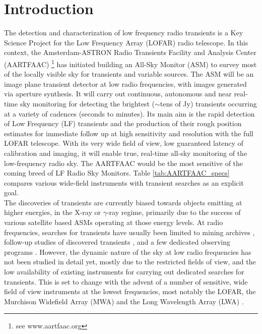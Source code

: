 \documentclass{aa}
\begin{document}

\maketitle

\section{\label{sec:Introduction}Introduction}
The detection  and characterization of low  frequency radio transients  is a Key
Science  Project \citep{fender2006lofar}  for  the Low  Frequency Array  (LOFAR)
\citep{unhealed2013lofar}    radio   telescope.     In    this   context,    the
Amsterdam-ASTRON    Radio    Transients    Facility    and    Analysis    Center
(AARTFAAC) \footnote{see  www.aartfaac.org }  has initiated building  an All-Sky
Monitor  (ASM) to  survey most  of the  locally visible  sky for  transients and
variable sources.   The ASM  will be  an image plane  transient detector  at low
radio frequencies, with images generated  via aperture synthesis.  It will carry
out continuous, autonomous  and near real-time sky monitoring  for detecting the
brightest  ($\sim$tens of  Jy) transients  occurring  at a  variety of  cadences
(seconds to minutes). Its main aim  is the rapid detection of Low Frequency (LF)
transients and  the production of  their rough position estimates  for immediate
follow up at high sensitivity and resolution with the full LOFAR telescope. With
its very wide field of view,  low guaranteed latency of calibration and imaging,
it will  enable true,  real-time all-sky monitoring  of the  low-frequency radio
sky. The AARTFAAC  would be the most  sensitive of the coming breed  of LF Radio
Sky  Monitors.   Table   \ref{tab:AARTFAAC_specs}  compares  various  wide-field
instruments with transient searches as an explicit goal.\\

The discoveries of  transients are currently biased towards  objects emitting at
higher  energies, in  the X-ray  or $\gamma$-ray  regime, primarily  due  to the
success of  various satellite  based ASMs operating  at those energy  levels. At
radio frequencies, searches  for transients have usually been  limited to mining
archives \citep{bower2007submillijansky,  bower2011search}, follow-up studies of
discovered  transients \citep{chandra2012radio}, and  a few  dedicated observing
programs  \citep{bannister2012limits,  katz2003survey}.   However,  the  dynamic
nature of the sky  at low radio frequencies has not been  studied in detail yet,
mostly  due to  the  restricted fields  of  view, and  the  low availability  of
existing instruments  for carrying out dedicated searches  for transients.  This
is set to  change with the advent of  a number of sensitive, wide  field of view
instruments at  the lowest  frequencies, most notably  the LOFAR,  the Murchison
Widefield  Array  (MWA) \citep{lonsdale2009murchison}  and  the Long  Wavelength
Array (LWA) \citep{ellingson2009long}.
\end{document}
